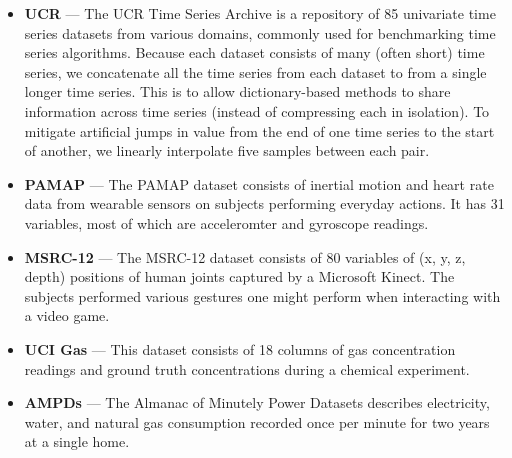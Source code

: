 \begin{itemize}[leftmargin=4mm]
\item \textbf{UCR} \cite{ucrTimeSeries} --- The UCR Time Series Archive is a repository of 85 univariate time series datasets from various domains, commonly used for benchmarking time series algorithms. Because each dataset consists of many (often short) time series, we concatenate all the time series from each dataset to from a single longer time series. This is to allow dictionary-based methods to share information across time series (instead of compressing each in isolation). To mitigate artificial jumps in value from the end of one time series to the start of another, we linearly interpolate five samples between each pair.
\item \textbf{PAMAP} \cite{pamap} --- The PAMAP dataset consists of inertial motion and heart rate data from wearable sensors on subjects performing everyday actions. It has 31 variables, most of which are acceleromter and gyroscope readings.
\item \textbf{MSRC-12} \cite{msrc} --- The MSRC-12 dataset consists of 80 variables of (x, y, z, depth) positions of human joints captured by a Microsoft Kinect. The subjects performed various gestures one might perform when interacting with a video game.
\item \textbf{UCI Gas} \cite{uci_gas} --- This dataset consists of 18 columns of gas concentration readings and ground truth concentrations during a chemical experiment.
\item \textbf{AMPDs} \cite{ampds} --- The Almanac of Minutely Power Datasets describes electricity, water, and natural gas consumption recorded once per minute for two years at a single home. %
\end{itemize}

